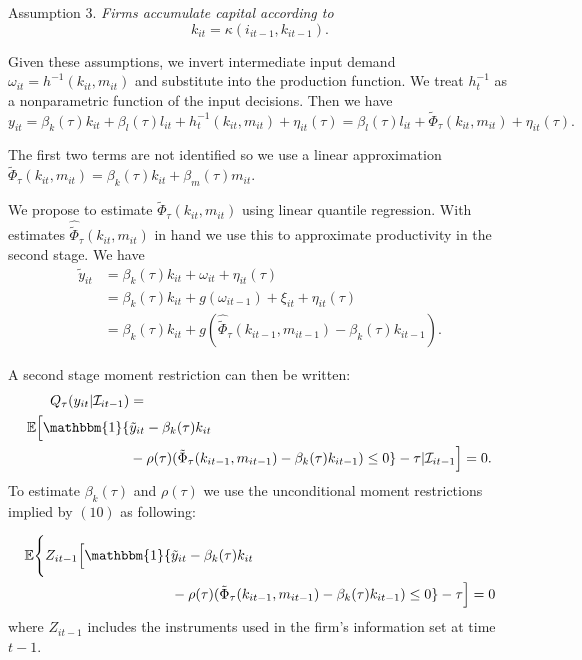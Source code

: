 \documentclass[11pt]{article}
\begin{document}
Assumption 3. \textit{Firms accumulate capital according to}
\begin{equation}
    k_{it}=\kappa(i_{it-1}, k_{it-1}).
\end{equation}

Given these assumptions, we invert intermediate input demand $\omega_{it}=h^{-1}(k_{it}, m_{it})$ and substitute into the production function. We treat $h_{t}^{-1}$ as a nonparametric function of the input decisions. Then we have
\begin{equation}
y_{it}=\beta_{k}(\tau)k_{it}+\beta_{l}(\tau)l_{it}+h_{t}^{-1}(k_{it}, m_{it})+\eta_{it}(\tau)=\beta_{l}(\tau)l_{it}+\tilde{\Phi}_{\tau}(k_{it}, m_{it})+\eta_{it}(\tau).
\end{equation}

The first two terms are not identified so we use a linear approximation $\tilde{\Phi}_{\tau}(k_{it}, m_{it})=\beta_{k}(\tau)k_{it}+\beta_{m}(\tau)m_{it}$.

We propose to estimate $\tilde{\Phi}_{\tau}(k_{it}, m_{it})$ using linear quantile regression.
With estimates $\hat{\tilde{\Phi}}_{\tau}(k_{it}, m_{it})$ in hand we use this to approximate productivity in the second stage. We have
\begin{equation}
\begin{split}
\tilde{y}_{it}&=\beta_{k}(\tau)k_{it}+\omega_{it}+\eta_{it}(\tau)\\
&=\beta_{k}(\tau)k_{it}+g(\omega_{it-1})+\xi_{it}+\eta_{it}(\tau)\\
&=\beta_{k}(\tau)k_{it}+g(\hat{\tilde{\Phi}}_{\tau}(k_{it-1}, m_{it-1})-\beta_{k}(\tau)k_{it-1}).
\end{split}
\end{equation}

A second stage moment restriction can then be written:
\begin{equation}
\begin{split}
Q_{\tau}(y_{it}|\mathcal{I}_{it-1})&=\\
\mathbb{E}\Big[\mathbbm{1}\{&\tilde{y}_{it}-\beta_{k}(\tau)k_{it}\\
&-\rho(\tau)(\tilde{\Phi}_{\tau}(k_{it-1}, m_{it-1})-\beta_{k}(\tau)k_{it-1})\leq 0\}-\tau|\mathcal{I}_{it-1}\Big]=0.
\end{split}
\end{equation}
To estimate $\beta_{k}(\tau)$ and $\rho(\tau)$ we use the unconditional moment restrictions implied by $(10)$ as following: 

\begin{equation}
\begin{split}
\mathbb{E}\Bigg\{Z_{it-1} \Big[\mathbbm{1}\{&\tilde{y}_{it}-\beta_{k}(\tau)k_{it}\\
&-\rho(\tau)(\tilde{\Phi}_{\tau}(k_{it-1}, m_{it-1})-\beta_{k}(\tau)k_{it-1})\leq 0\}-\tau\Big]=0
\end{split}
\end{equation}
where $Z_{it-1}$ includes the instruments used in the firm's information set at time $t-1$.
\end{document}
